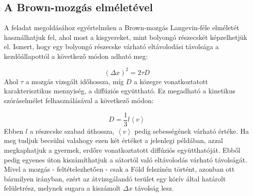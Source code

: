 \section{} \label{sec:1}

\subsection{A Brown-mozgás elméletével} \label{sub:3.1}
A feladat megoldásához egyértelműen a Brown-mozgás Langevin-féle elméletét használhatjuk fel, ahol most a kisgyereket, mint bolyongó részecskét képzelhetjük el. Ismert, hogy egy bolyongó részecske várható eltávolodási távolsága a kezdőállapottól a következő módon adható meg:

\begin{equation}
    \left( \Delta x \right)^{2}
    =
    2 \tau D
\end{equation}
Ahol $\tau$ a mozgás vizsgált időhossza, míg $D$ a közegre vonatkoztatott karakterisztikus mennyiség, a diffúziós együttható. Ez megadható a kinetikus szóráselmélet felhasználásával a következő módon:

\begin{equation}
    D
    =
    \frac{1}{3} l \left< v \right>
\end{equation}
Ebben $l$ a részecske szabad úthossza, $\left< v \right>$ pedig sebességének várható értéke. Ha meg tudjuk becsülni valahogy ezen két értéket a jelenlegi példában, azzal megkaphatjuk a gyermek, erdőre vonatkoztatott diffúziós együtthatóját. Ebből pedig egyenes úton kiszámíthatjuk a sátortól való eltávolodás várható távolságát. Mivel a mozgás - feltételezhetően - csak a Föld felszínén történt, azonban ott bármilyen irányban, ezért az átvizsgálandó terület egy körív által határolt felületrész, melynek sugara a kiszámolt $\Delta x$ távolság lesz.
\\ \\
